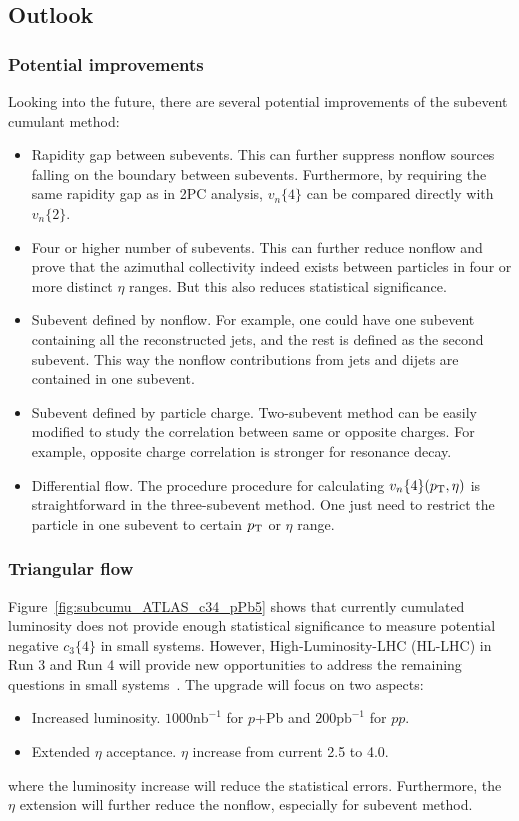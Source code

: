 \subsection{Outlook}

\subsubsection{Potential improvements}

Looking into the future, there are several potential improvements of the subevent cumulant method:
\begin{itemize}
\item Rapidity gap between subevents. This can further suppress nonflow sources falling on the boundary between subevents. Furthermore, by requiring the same rapidity gap as in 2PC analysis, $v_n\{4\}$ can be compared directly with $v_n\{2\}$.
\item Four or higher number of subevents. This can further reduce nonflow and prove that the azimuthal collectivity indeed exists between particles in four or more distinct $\eta$ ranges. But this also reduces statistical significance.
\item Subevent defined by nonflow. For example, one could have one subevent containing all the reconstructed jets, and the rest is defined as the second subevent. This way the nonflow contributions from jets and dijets are contained in one subevent.
\item Subevent defined by particle charge. Two-subevent method can be easily modified to study the correlation between same or opposite charges. For example, opposite charge correlation is stronger for resonance decay.
\item Differential flow. The procedure procedure for calculating $v_n\{4\}(p_\text{T},\eta)$ is straightforward in the three-subevent method. One just need to restrict the particle in one subevent to certain $p_\text{T}$ or $\eta$ range.
\end{itemize}



\subsubsection{Triangular flow}

Figure~\ref{fig:subcumu_ATLAS_c34_pPb5} shows that currently cumulated luminosity does not provide enough statistical significance to measure potential negative $c_3\{4\}$ in small systems. However, High-Luminosity-LHC (HL-LHC) in Run 3 and Run 4 will provide new opportunities to address the remaining questions in small systems~\cite{Citron:2018lsq}. The upgrade will focus on two aspects:
\begin{itemize}
\item Increased luminosity. $1000\text{nb}^{-1}$ for $p$+Pb and $200\text{pb}^{-1}$ for $pp$.
\item Extended $\eta$ acceptance. $\eta$ increase from current 2.5 to 4.0.
\end{itemize}
where the luminosity increase will reduce the statistical errors. Furthermore, the $\eta$ extension will further reduce the nonflow, especially for subevent method.

